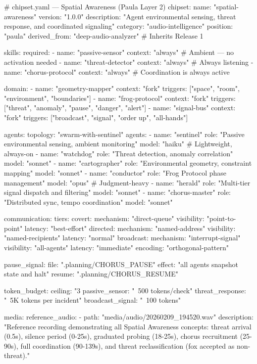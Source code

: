 \documentclass[11pt,letterpaper]{article}
\begin{document}
\begin{asciibox}
# chipset.yaml — Spatial Awareness (Paula Layer 2)
chipset:
  name: "spatial-awareness"
  version: "1.0.0"
  description: "Agent environmental sensing, threat response,
                and coordinated signaling"
  category: "audio-intelligence"
  position: "paula"
  derived_from: "deep-audio-analyzer"  # Inherits Release 1

skills:
  required:
    - name: "passive-sensor"
      context: "always"     # Ambient — no activation needed
    - name: "threat-detector"
      context: "always"     # Always listening
    - name: "chorus-protocol"
      context: "always"     # Coordination is always active

  domain:
    - name: "geometry-mapper"
      context: "fork"
      triggers: ["space", "room", "environment", "boundaries"]
    - name: "frog-protocol"
      context: "fork"
      triggers: ["threat", "anomaly", "pause", "danger", "alert"]
    - name: "signal-bus"
      context: "fork"
      triggers: ["broadcast", "signal", "order up", "all-hands"]

agents:
  topology: "swarm-with-sentinel"
  agents:
    - name: "sentinel"
      role: "Passive environmental sensing, ambient monitoring"
      model: "haiku"         # Lightweight, always-on
    - name: "watchdog"
      role: "Threat detection, anomaly correlation"
      model: "sonnet"
    - name: "cartographer"
      role: "Environmental geometry, constraint mapping"
      model: "sonnet"
    - name: "conductor"
      role: "Frog Protocol phase management"
      model: "opus"          # Judgment-heavy
    - name: "herald"
      role: "Multi-tier signal dispatch and filtering"
      model: "sonnet"
    - name: "chorus-master"
      role: "Distributed sync, tempo coordination"
      model: "sonnet"

communication:
  tiers:
    covert:
      mechanism: "direct-queue"
      visibility: "point-to-point"
      latency: "best-effort"
    directed:
      mechanism: "named-address"
      visibility: "named-recipients"
      latency: "normal"
    broadcast:
      mechanism: "interrupt-signal"
      visibility: "all-agents"
      latency: "immediate"
      encoding: "orthogonal-pattern"

  pause_signal:
    file: ".planning/CHORUS_PAUSE"
    effect: "all agents snapshot state and halt"
    resume: ".planning/CHORUS_RESUME"

token_budget:
  ceiling: "3%
  passive_sensor: "~500 tokens/check"
  threat_response: "~5K tokens per incident"
  broadcast_signal: "~100 tokens"

media:
  reference_audio:
    - path: "media/audio/20260209_194520.wav"
      description: "Reference recording demonstrating all
                     Spatial Awareness concepts: threat
                     arrival (0.5s), silence period (0-25s),
                     graduated probing (18-25s), chorus
                     recruitment (25-90s), full coordination
                     (90-139s), and threat reclassification
                     (fox accepted as non-threat)."
\end{asciibox}
\end{document}
